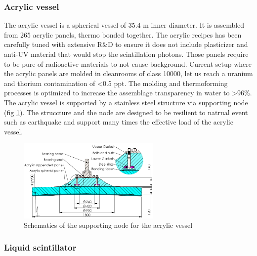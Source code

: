 \subsubsection{Acrylic vessel}
The acrylic vessel is a spherical vessel of 35.4 m inner diameter. It is assembled from 265 acrylic panels, thermo bonded together. The acrylic recipes has been carefully tuned with extensive R\&D to ensure it does not include plasticizer and anti-UV material that would stop the scintillation photons.
Those panels require to be pure of radioactive materials to not cause background. Current setup where the acrylic panels are molded in cleanrooms of class 10000, let us reach a uranium and thorium contamination of <0.5 ppt. The molding and thermoforming processes is optimized to increase the assemblage transparency in water to >96\%. The acrylic vessel is supported by a stainless steel structure via supporting node (fig \ref{fig:sup_node}). The struccture and the node are designed to be resilient to natrual event such as earthquake and support many times the effective load of the acrylic vessel.

\begin{figure}[ht]
  \centering
  \includegraphics[height=4cm]{images/juno/node_b.png}
  \caption{Schematics of the supporting node for the acrylic vessel}
  \label{fig:sup_node}
\end{figure}

\subsubsection{Liquid scintillator}
\label{sec:LS}

